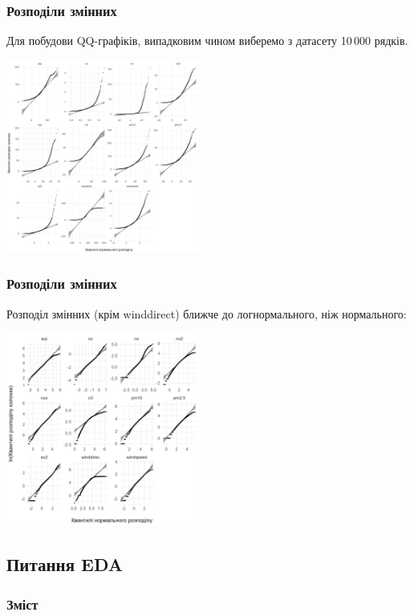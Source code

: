 \documentclass{beamer}
\begin{document}
\begin{frame}
  \frametitle{Розподіли змінних}

  Для побудови QQ-графіків, випадковим чином виберемо з датасету 10\,000 рядків.

  \begin{center}
    \includegraphics[height=2.5in]{plots/qq_tidy/qq.png}
  \end{center}
\end{frame}

\begin{frame}
  \frametitle{Розподіли змінних}

  Розподіл змінних (крім winddirect) ближче до логнормального, ніж нормального:

  \begin{center}
    \includegraphics[height=2.5in]{plots/qq_tidy/qq-log.png}
  \end{center}
\end{frame}

\begin{frame}
  \section{Питання EDA}

  \frametitle{Зміст}
  \tableofcontents[currentsection]
\end{frame}
\end{document}
